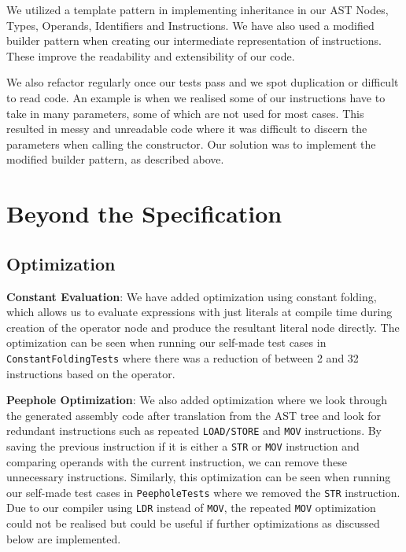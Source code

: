 \documentclass[11pt,a4paper]{article}
\newcommand{\cmd}[1]{\texttt{#1}}
\begin{document}
We utilized a template pattern in implementing inheritance in our AST Nodes, Types, Operands, Identifiers and Instructions. We have also used a modified builder pattern when creating our intermediate representation of instructions. These improve the readability and extensibility of our code. 

We also refactor regularly once our tests pass and we spot duplication or difficult to read code. An example is when we realised some of our instructions have to take in many parameters, some of which are not used for most cases. This resulted in messy and unreadable code where it was difficult to discern the parameters when calling the constructor. Our solution was to implement the modified builder pattern, as described above.

\section{Beyond the Specification}

\subsection{Optimization}
\textbf{Constant Evaluation}: We have added optimization using constant folding, which allows us to evaluate expressions with just literals at compile time during creation of the operator node and produce the resultant literal node directly. The optimization can be seen when running our self-made test cases in \cmd{ConstantFoldingTests} where there was a reduction of between 2 and 32 instructions based on the operator. 
\newline

\noindent \textbf{Peephole Optimization}: We also added optimization where we look through the generated assembly code after translation from the AST tree and look for redundant instructions such as repeated \cmd{LOAD/STORE} and \cmd{MOV} instructions. By saving the previous instruction if it is either a \cmd{STR} or \cmd{MOV} instruction and comparing operands with the current instruction, we can remove these unnecessary instructions. 
Similarly, this optimization can be seen when running our self-made test cases in \cmd{PeepholeTests} where we removed the \cmd{STR} instruction. Due to our compiler using \cmd{LDR} instead of \cmd{MOV}, the repeated \cmd{MOV} optimization could not be realised but could be useful if further optimizations as discussed below are implemented. 
\newline
\end{document}
